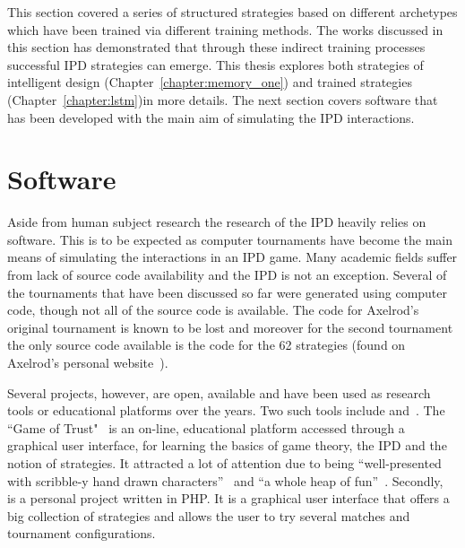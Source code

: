 This section covered a series of structured strategies based on different
archetypes which have been trained via different training methods. The works
discussed in this section has demonstrated that through these indirect
training processes successful IPD strategies can emerge. This thesis explores
both strategies of intelligent design (Chapter~\ref{chapter:memory_one}) and
trained strategies (Chapter~\ref{chapter:lstm})in more details. The next section
covers software that has been developed with the main aim of simulating the IPD
interactions.

\section{Software}\label{section:software}

Aside from human subject research the research of the IPD heavily relies on software.
This is to be expected as computer tournaments have become the main
means of simulating the interactions in an IPD game.
Many academic fields suffer from lack of source code availability and the IPD
is not an exception. Several of the tournaments that have been discussed so far were generated
using computer code, though not all of the source code is available.
The code for Axelrod's original tournament is known to be lost and
moreover for the second tournament the only source code available is the code
for the 62 strategies (found on Axelrod's personal website~\cite{fortan_code}).

Several projects, however, are open, available and have been used as research
tools or educational platforms over the years. Two such tools include
\cite{pd_trust} and~\cite{trust_blogb}.
The ``Game of Trust"~\cite{pd_trust} is an on-line, educational platform accessed 
through a graphical user interface,
for learning the basics of game theory, the IPD
and the notion of strategies. It attracted a lot of attention
due to being ``well-presented with scribble-y hand drawn
characters''~\cite{trust_blogb} and ``a whole heap of fun''~\cite{trust_bloga}.
Secondly,~\cite{pd_game} is a personal project written in PHP. It is a graphical user
interface that offers a big collection of strategies and allows the user to try
several matches and tournament configurations.


